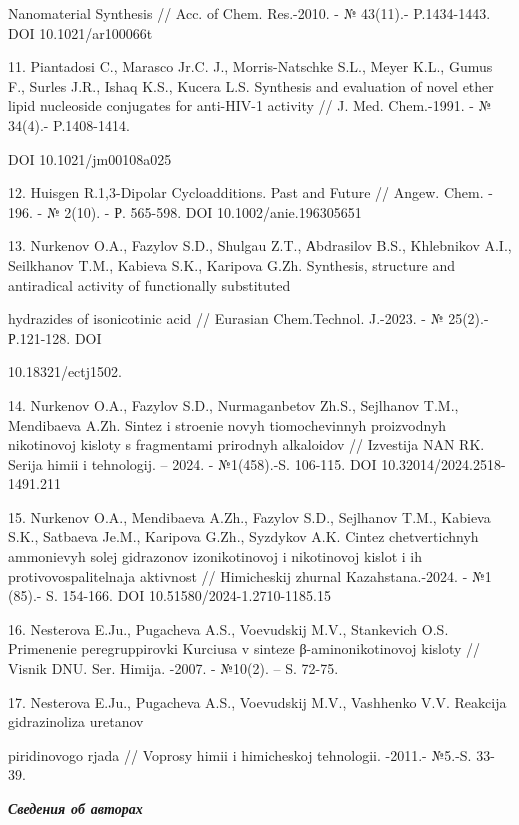 \begin{noparindent}
Nanomaterial Synthesis // Acc. of Chem.
Res.-2010. - № 43(11).- P.1434-1443. DOI 10.1021/ar100066t

11. Piantadosi C., Marasco Jr.C. J., Morris-Natschke S.L., Meyer K.L.,
Gumus F., Surles J.R., Ishaq K.S., Kucera L.S. Synthesis and evaluation
of novel ether lipid nucleoside conjugates for anti-HIV-1 activity // J.
Med. Chem.-1991. - № 34(4).- P.1408-1414.

DOI 10.1021/jm00108a025

12. Huisgen R.1,3-Dipolar Cycloadditions. Past and Future // Angew.
Chem. - 196. - № 2(10). - Р. 565-598. DOI 10.1002/anie.196305651

13. Nurkenov O.A., Fazylov S.D., Shulgau Z.T., Аbdrasilov B.S.,
Khlebnikov A.I., Seilkhanov T.M., Kabieva S.K., Karipova G.Zh.
Synthesis, structure and antiradical activity of functionally
substituted

hydrazides of isonicotinic acid // Eurasian Chem.Technol.
J.-2023. - № 25(2).- Р.121-128. DOI

10.18321/ectj1502.

14. Nurkenov O.A., Fazylov S.D., Nurmaganbetov Zh.S., Sejlhanov T.M.,
Mendibaeva A.Zh. Sintez i stroenie novyh tiomochevinnyh proizvodnyh
nikotinovoj kisloty s fragmentami prirodnyh alkaloidov // Izvestija NAN
RK. Serija himii i tehnologij. -- 2024. - №1(458).-S. 106-115. DOI
10.32014/2024.2518-1491.211

15. Nurkenov O.A., Mendibaeva A.Zh., Fazylov S.D., Sejlhanov T.M.,
Kabieva S.K., Satbaeva Je.M., Karipova G.Zh., Syzdykov A.K. Cintez
chetvertichnyh ammonievyh solej gidrazonov izonikotinovoj i nikotinovoj
kislot i ih protivovospalitel\textquotesingle naja
aktivnost\textquotesingle{} // Himicheskij zhurnal Kazahstana.-2024. -
№1 (85).- S. 154-166. DOI 10.51580/2024-1.2710-1185.15

16. Nesterova E.Ju., Pugacheva A.S., Voevudskij M.V., Stankevich O.S.
Primenenie peregruppirovki Kurciusa v sinteze β-aminonikotinovoj kisloty
// Visnik DNU. Ser. Himija. -2007. - №10(2). -- S. 72-75.

17. Nesterova E.Ju., Pugacheva A.S., Voevudskij M.V., Vashhenko V.V.
Reakcija gidrazinoliza uretanov

piridinovogo rjada // Voprosy himii i
himicheskoj tehnologii. -2011.- №5.-S. 33-39.
\end{noparindent}

\emph{{\bfseries Сведения об авторах}}

